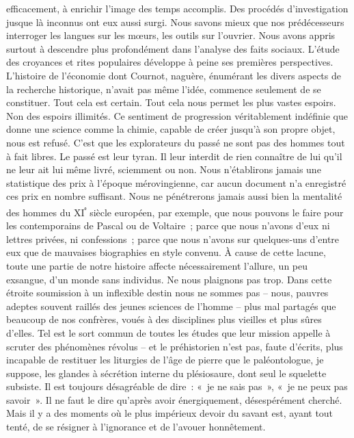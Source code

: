 \documentclass[french,twoside]{book} %
\begin{document}
\label{p23} efficacement, à enrichir l’image des temps accomplis. Des procédés d’in­vestigation jusque là inconnus ont eux aussi surgi. Nous savons mieux que nos prédécesseurs interroger les langues sur les mœurs, les outils sur l’ouvrier. Nous avons appris surtout à descendre plus profondément dans l’analyse des faits sociaux. L’étude des croyances et rites populaires développe à peine ses premières perspectives. L’histoire de l’économie dont Cournot, naguère, énumérant les divers aspects de la recherche historique, n’avait pas même l’idée, commence seulement de se constituer. Tout cela est certain. Tout cela nous permet les plus vastes espoirs. Non des espoirs illimités. Ce sentiment de progression véritablement indéfinie que donne une science comme la chimie, capable de créer jusqu’à son propre objet, nous est refusé. C’est que les explorateurs du passé ne sont pas des hommes tout à fait libres. Le passé est leur tyran. Il leur interdit de rien connaître de lui qu’il ne leur ait lui même livré, sciemment ou non. Nous n’établirons jamais une statistique des prix à l’époque méro­vingienne, car aucun document n’a enregistré ces prix en nombre suffisant. Nous ne pénétrerons jamais aussi bien la mentalité des hommes du XI\textsuperscript{ᵉ} siècle européen, par exemple, que nous pouvons le faire pour les contem­porains de Pascal ou de Voltaire ; parce que nous n’avons d’eux ni lettres privées, ni confessions ; parce que nous n’avons sur quelques‑uns d’entre eux que de mauvaises biographies en style convenu. À cause de cette lacune, toute une partie de notre histoire affecte nécessairement l’allure, un peu exsangue, d’un monde sans individus. Ne nous plaignons pas trop. Dans cette étroite soumission à un inflexible destin nous ne sommes pas – nous, pauvres adeptes souvent raillés des jeunes sciences de l’homme – plus mal partagés que beaucoup de nos confrères, voués à des disciplines plus vieilles et plus sûres d’elles. Tel est le sort commun de toutes les études que leur mission appelle à scruter des phénomènes révolus – et le préhistorien n’est pas, faute d’écrits, plus incapable de restituer les litur­gies de l’âge de pierre que le paléontologue, je suppose, les glandes à sécrétion interne du plésiosaure, dont seul le squelette subsiste. Il est toujours désagréable de dire : « je ne sais pas », « je ne peux pas savoir ». Il ne faut le dire qu’après avoir énergiquement, désespérément cherché. Mais il y a des moments où le plus impérieux devoir du savant est, ayant tout tenté, de se résigner à l’ignorance et de l’avouer honnêtement.
\end{document}
